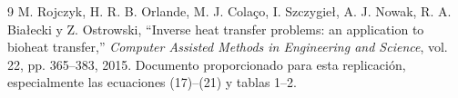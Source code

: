 \documentclass[11pt,a4paper]{article}
\begin{document}
\begin{thebibliography}{9}
 M. Rojczyk, H. R. B. Orlande, M. J. Colaço, I. Szczygieł, A. J. Nowak, R. A. Białecki y Z. Ostrowski, ``Inverse heat transfer problems: an application to bioheat transfer,'' \textit{Computer Assisted Methods in Engineering and Science}, vol. 22, pp. 365--383, 2015. Documento proporcionado para esta replicación, especialmente las ecuaciones (17)--(21) y tablas 1--2.
\end{thebibliography}
\end{document}
